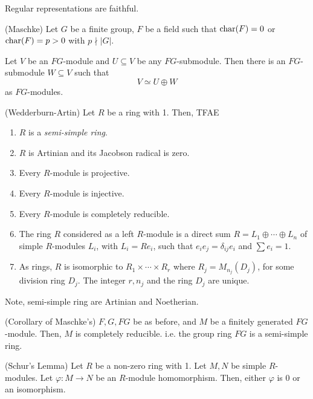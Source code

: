 \documentclass{article}
\begin{document}
\begin{theorem}
  Regular representations are faithful.
\end{theorem}

\begin{theorem}(Maschke)
  Let \(G\) be a finite group, \(F\) be a field
  such that \(\textnormal{char}(F) = 0\) or \(\textnormal{char}(F) = p > 0\) with \(p \nmid |G|\).

  Let \(V\) be an \(FG\)-module and \(U \subseteq V\)
  be any \(FG\)-submodule.
  Then there is an \(FG\)-submodule \(W \subseteq V\)
  such that
  \[V \simeq U \oplus W\]
  as \(FG\)-modules.
\end{theorem}

\begin{theorem}(Wedderburn-Artin)
  Let \(R\) be a ring with 1. Then, TFAE
  \begin{enumerate}
  \item \(R\) is a \emph{semi-simple ring}.
  \item \(R\) is Artinian and its Jacobson radical is zero.
  \item Every \(R\)-module is projective.
  \item Every \(R\)-module is injective.
  \item Every \(R\)-module is completely reducible.
  \item The ring \(R\) considered as a left \(R\)-module is a direct sum
    \(R = L_1 \oplus \cdots \oplus L_n\) of simple \(R\)-modules \(L_i\),
    with \(L_i = Re_i\),
    such that \(e_i e_j = \delta_{ij}e_i\) and \(\sum e_i = 1\).
  \item As rings, \(R\) is isomorphic to \(R_1 \times \cdots \times R_r\)
    where \(R_j = M_{n_j}(D_j)\), for some division ring \(D_j\).
    The integer \(r, n_j\) and the ring \(D_j\) are unique.
  \end{enumerate}
  Note, semi-simple ring are Artinian and Noetherian.
\end{theorem}

\begin{corollary}(Corollary of Maschke's)
  \(F, G, FG\) be as before, and \(M\) be a finitely generated \(FG\)-module.
  Then, \(M\) is completely reducible.
  i.e. the group ring \(FG\) is a semi-simple ring.
\end{corollary}

\begin{theorem}(Schur's Lemma)
  Let \(R\) be a non-zero ring with 1.
  Let \(M, N\) be simple \(R\)-modules.
  Let \(\varphi: M \to N\) be an \(R\)-module homomorphism.
  Then, either \(\varphi\) is 0 or an isomorphism.
\end{theorem}
\end{document}
